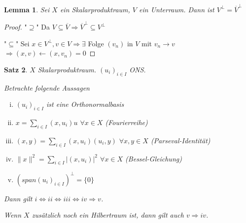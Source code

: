 \documentclass[ngerman]{report}
\theoremstyle{plain}%
\newtheorem{thm}{Satz}[chapter]
\newtheorem{lemma}[thm]{Lemma}
\theoremstyle{definition}%
\theoremstyle{myStyle}
\newcommand{\norm}[1]{\|#1\|}
\newcommand{\df}[1][]{%
	\overset{#1}{\Rightarrow}
}
\newcommand{\aq}{\Leftrightarrow} %
\newcommand{\qmarks}[1]{"#1"}
\newcommand{\ff}[3]{(#1_#2)_{#2\in#3}}
\begin{document}
	\begin{lemma}
		Sei $X$ ein Skalarproduktraum, $V$ ein Unterraum. Dann ist $V^\perp = \overline{V}^\perp$
	\end{lemma}
	\begin{proof}
		\qmarks{$\supseteq$}  Da $V\subseteq \overline{V} \df \overline{V}^\perp \subseteq V^\perp$ \par
		\qmarks{$\subseteq$} Sei $x\in V^\perp, v\in V \df \exists$ Folge $(v_n)$ in $V$ mit $v_n \to v$
		$\df (x,v) \leftarrow (x,v_n) = 0$
	\end{proof}

 	\begin{thm}
		$X$ Skalarproduktraum. $\ff{u}{i}{I}$ ONS.\par
		Betrachte folgende Aussagen
			\begin{enumerate}[(i)]
				\item $\ff{u}{i}{I}$ ist eine Orthonormalbasis
				\item $x = \sum_{i\in I} (x, u_i)u$ $\forall x\in X$ (Fourierreihe)
				\item $(x,y) = \sum_{i\in I}(x,u_i)(u_i,y)$ $\forall x,y \in X$ (Parseval-Identität)
				\item $\norm{x}^2 = \sum_{i\in I}|(x,u_i)|^2$ $\forall x\in X$ (Bessel-Gleichung)
				\item $(span\ff{u}{i}{I})^\perp = \{0\}$
			\end{enumerate}
			Dann gilt $i \aq ii \aq iii \aq iv \df v$.\par
			Wenn $X$ zusätzlich noch ein Hilbertraum ist, dann gilt auch $v\df iv$.
	\end{thm}	
\end{document}
